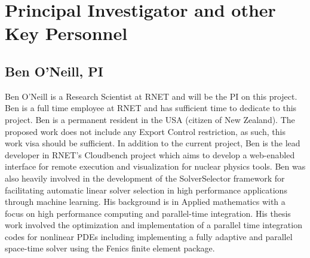 \section{Principal Investigator and other Key Personnel}

\subsection{Ben O'Neill, PI}
Ben O'Neill is a Research Scientist at RNET and will be the PI on this project. Ben is a full time employee at
RNET and has sufficient time to dedicate to this project. Ben is a permanent resident in the USA (citizen of New Zealand). The proposed work does not include any Export Control restriction, as such, this work visa should be sufficient. In addition to the current project, Ben is the lead developer in RNET's
Cloudbench project which aims to develop a web-enabled interface for remote execution and visualization for nuclear physics tools. Ben was also heavily involved in the development of  the SolverSelector framework for facilitating automatic linear solver selection in high performance applications through machine learning. His background is in Applied mathematics with a focus on high performance computing and parallel-time integration. His thesis work involved the optimization and implementation of a parallel time integration codes for nonlinear PDEs including implementing a fully adaptive and parallel space-time solver using the Fenics finite element package.

